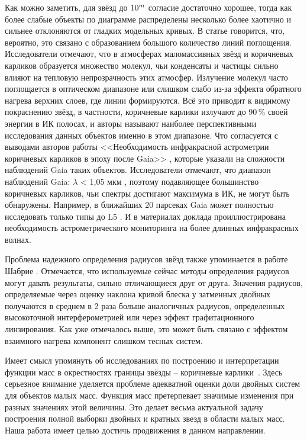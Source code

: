 Как можно заметить, для звёзд до \(\textup{10}^m\) согласие достаточно хорошее, тогда как более слабые объекты по диаграмме распределены несколько более хаотично и сильнее отклоняются от гладких модельных кривых. В статье говорится, что, вероятно, это связано с образованием большого количество линий поглощения. Исследователи отмечают, что в атмосферах маломассивных звёзд и коричневых карликов образуется множество молекул, чьи конденсаты и частицы сильно влияют на тепловую непрозрачность этих атмосфер. Излучение молекул часто поглощается в оптическом диапазоне или слишком слабо из-за эффекта обратного нагрева верхних слоев, где линии формируются. Всё это приводит к видимому покраснению звёзд, в частности, коричневые карлики излучают до 90\,\% своей энергии в ИК полосах, и авторы называют наиболее перспективными исследования данных объектов именно в этом диапазоне. Что согласуется с выводами авторов работы <<Необходимость инфракрасной астрометрии коричневых карликов в эпоху после Gaia>> \cite{2019BAAS...51c.105K}, которые указали на сложности наблюдений Gaia таких объектов. Исследователи отмечают, что диапазон наблюдений Gaia: $\lambda$ < 1,05 мкм \cite{2016A&A...595A...1G}, поэтому подавляющее большинство коричневых карликов, чьи спектры достигают максимума в ИК, не могут быть обнаружены. Например, в ближайших 20 парсеках Gaia может полностью исследовать только типы до L5 \cite{2019ApJS..240...19K}. И в материалах доклада проиллюстрирована необходимость астрометрического мониторинга на более длинных инфракрасных волнах.

Проблема надежного определения радиусов звёзд также упоминается в работе Шабрие \cite{2005astro.ph..9798C}. Отмечается, что используемые сейчас методы определения радиусов могут давать результаты, сильно отличающиеся друг от друга. Значения радиусов, определяемые через оценку наклона кривой блеска у затменных двойных получаются в среднем в 2 раза больше аналогичных радиусов, определенных высокоточной интерферометрией или через эффект графитационного линзирования. Как уже отмечалось выше, это может быть связано с эффектом взаимного нагрева компонент слишком тесных систем.

Имеет смысл упомянуть об исследованиях по построению и интерпретации функции масс в окрестностях границы \glqq звёзды -- коричневые карлики\grqq\ \cite{2015ApJ...800...72T}. Здесь серьезное внимание уделяется проблеме адекватной оценки доли двойных систем для объектов малых масс. Функция масс претерпевает значимые изменения при разных значениях этой величины.  Это делает весьма актуальной задачу построения полной выборки двойных и кратных звезд в области малых масс. Наша работа имеет целью достичь продвижения в данном направлении.

